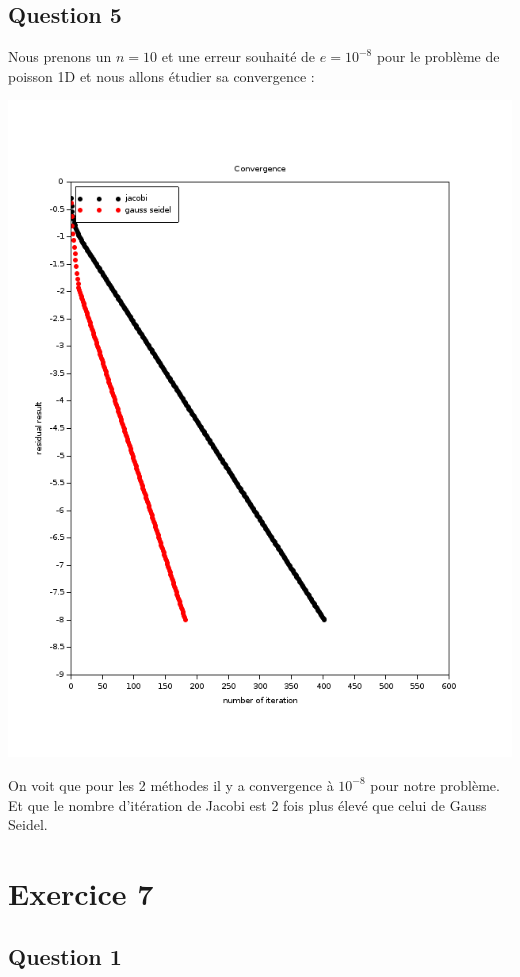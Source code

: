 \documentclass[11pt]{article}
\begin{document}
\subsection{Question 5}

Nous prenons un $n = 10$ et une erreur souhaité de $e = 10^{-8}$ pour
le problème de poisson 1D et nous allons étudier sa convergence :

\includegraphics[scale=0.5]{img/convergence.png}

On voit que pour les 2 méthodes il y a convergence à $10^{-8}$ pour
notre problème. Et que le nombre d'itération de Jacobi est 2 fois plus
élevé que celui de Gauss Seidel.

\section{Exercice 7}

\subsection{Question 1}
\end{document}
